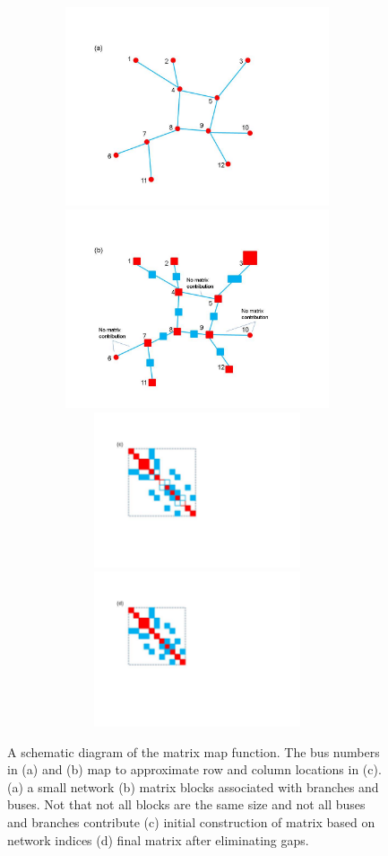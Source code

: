 \begin{figure}
  \centering
    \includegraphics*[width=6.50in, height=2.3in, keepaspectratio=true, trim=0.00in 0.39in 0.00in 0.82in]{figures/Mapper-a}
    \includegraphics*[width=6.50in, height=2.3in, keepaspectratio=true, trim=0.00in 0.38in 0.00in 0.85in]{figures/Mapper-b}
    \includegraphics*[width=6.50in, height=1.8in, keepaspectratio=true, trim=0.00in 1.79in 0.00in 0.83in]{figures/Mapper-c}
    \includegraphics*[width=6.50in, height=1.8in, keepaspectratio=true, trim=0.00in 1.79in 0.00in 0.85in]{figures/Mapper-d}
  \caption{A schematic diagram of the matrix map function. The bus numbers in (a) and (b) map to approximate row and column locations in (c). (a) a small network (b) matrix blocks associated with branches and buses. Not that not all blocks are the same size and not all buses and branches contribute (c) initial construction of matrix based on network indices (d) final matrix after eliminating gaps.}
  \label{fig:mapper}
\end{figure}

